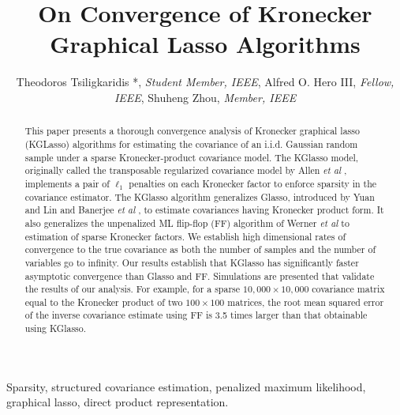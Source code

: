 \documentclass[journal,11pt,draftcls,onecolumn]{IEEEtran}
\begin{document}
\title{On Convergence of Kronecker Graphical Lasso Algorithms}
\author{Theodoros Tsiligkaridis *, \textit{Student Member, IEEE}, Alfred O. Hero III, \textit{Fellow, IEEE}, Shuheng Zhou, \textit{Member, IEEE}}

\maketitle

\begin{abstract}
This paper presents a thorough convergence analysis of 
Kronecker graphical lasso (KGLasso) algorithms for estimating the covariance of an i.i.d. Gaussian random sample under a sparse Kronecker-product covariance model. The KGlasso model, originally called the transposable regularized covariance model by Allen {\it et al}  \cite{AllenTib10}, implements a pair of $\ell_1$ penalties on each Kronecker factor to enforce sparsity in the covariance estimator.   The KGlasso algorithm generalizes Glasso, introduced by Yuan and Lin \cite{YL07} and Banerjee {\it et al} \cite{ModelSel}, to estimate covariances having Kronecker product form.   It  also generalizes  the unpenalized ML flip-flop (FF) algorithm of Werner {\it et al} \cite{EstCovMatKron} to estimation of sparse Kronecker factors. %
We establish high dimensional rates of convergence to the true covariance as both the number of samples and the number of variables go to infinity. Our results establish that KGlasso has significantly faster asymptotic convergence than Glasso and FF. Simulations are presented that validate the results of our analysis.  For example, for a sparse $10,000 \times 10,000$ covariance matrix equal to the Kronecker product of two $100 \times 100$ matrices, the root mean squared error of the inverse covariance estimate using FF is 3.5 times larger than that obtainable using KGlasso.
\end{abstract} 

\begin{keywords}
	Sparsity, structured covariance estimation, penalized maximum likelihood, graphical lasso, direct product representation.
\end{keywords}
\end{document}
